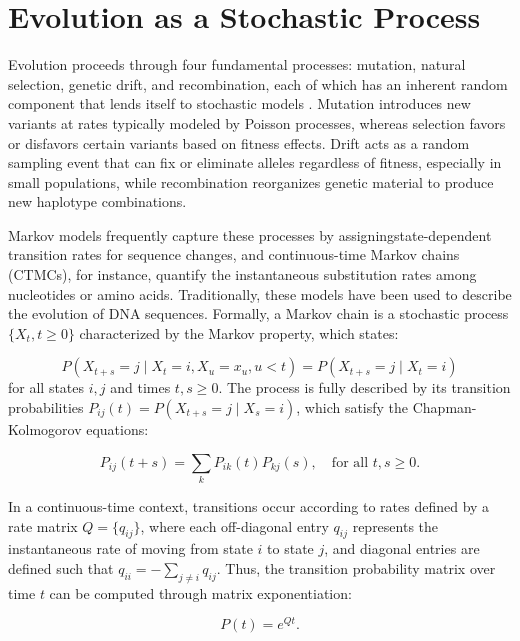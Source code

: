 \section{Evolution as a Stochastic Process}
Evolution proceeds through four fundamental processes: mutation, natural selection, genetic drift, and recombination, each of which has an inherent random component that lends itself to stochastic models \cite{Arenas2015, siepel2009}. Mutation introduces new variants at rates typically modeled by Poisson processes, whereas selection favors or disfavors certain variants based on fitness effects. Drift acts as a random sampling event that can fix or eliminate alleles regardless of fitness, especially in small populations, while recombination reorganizes genetic material to produce new haplotype combinations.

Markov models frequently capture these processes by assigning\linebreak state-dependent transition rates for sequence changes, and continuous-time Markov chains (CTMCs), for instance, quantify the instantaneous substitution rates among nucleotides or amino acids. Traditionally, these models have been used to describe the evolution of DNA sequences. Formally, a Markov chain is a stochastic process $\{X_t, t \geq 0\}$ characterized by the Markov property, which states:

\begin{equation}
P(X_{t+s} = j \mid X_t = i, X_u = x_u, u < t) = P(X_{t+s} = j \mid X_t = i)
\end{equation}
for all states $i, j$ and times $t, s \geq 0$. The process is fully described by its transition probabilities $P_{ij}(t) = P(X_{t+s}=j \mid X_s=i)$, which satisfy the Chapman-Kolmogorov equations:

\begin{equation}
P_{ij}(t+s) = \sum_{k} P_{ik}(t) P_{kj}(s), \quad \text{for all } t,s \geq 0.
\end{equation}

In a continuous-time context, transitions occur according to rates defined by a rate matrix $Q = \{q_{ij}\}$, where each off-diagonal entry $q_{ij}$ represents the instantaneous rate of moving from state $i$ to state $j$, and diagonal entries are defined such that $q_{ii} = -\sum_{j \neq i} q_{ij}$. Thus, the transition probability matrix over time $t$ can be computed through matrix exponentiation:

\begin{equation}
P(t) = e^{Qt}.
\end{equation}

